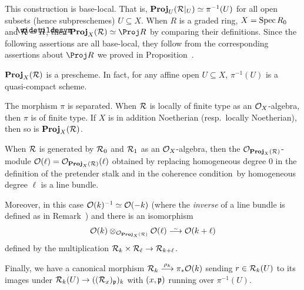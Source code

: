 \documentclass[a4paper,parskip=half,numbers=enddot, DIV=12]{scrreprt}
\begin{document}
This construction is base-local. That is, $\operatorname{\mathbf{Proj}}_U(\mathcal{R}|_U)\simeq \pi^{-1}(U)$ for all open subsets (hence subpreschemes) $U\subseteq X$. When $R$ is a graded ring, $X=\operatorname{Spec} R_0$ and $\Rr=\snake{R}$, then $\PROJ_X(\Rr)\simeq \Proj R$ by comparing their definitions. Since the following assertions are all base-local, they follow from the corresponding assertions about $\Proj R$ we proved in Proposition~.
\begin{fact}
	\begin{alphanumerate}
		\item {}$\operatorname{\mathbf{Proj}}_X(\mathcal{R})$ is a prescheme. In fact, for any affine open $U\subseteq X$, $\pi^{-1}(U)$ is a quasi-compact scheme.
		\item The morphism $\pi$ is separated. When $\mathcal{R}$ is locally of finite type as an $\mathcal{O}_X$-algebra, then $\pi$ is of finite type. If $X$ is in addition Noetherian (resp.\ locally Noetherian), then so is $\operatorname{\mathbf{Proj}}_X(\mathcal{R})$.
		\item When $\mathcal{R}$ is generated by $\mathcal{R}_0$ and $\mathcal{R}_1$ as an $\mathcal{O}_X$-algebra, then the $\mathcal{O}_{\operatorname{\mathbf{Proj}}_X(\mathcal{R})}$-module $\mathcal{O}(\ell)=\mathcal{O}_{\operatorname{\mathbf{Proj}}_X(\mathcal{R})}(\ell)$ obtained by replacing homogeneous degree $0$ in the definition of the pretender stalk and in the coherence condition\texttrademark\ by homogeneous degree $\ell$ is a line bundle. 
		
		Moreover, in this case $\mathcal{O}(k)^{-1}\simeq \mathcal{O}(-k)$ (where the \emph{inverse} of a line bundle is defined as in Remark~) and there is an isomorphism 
		\begin{align*}
			\Oo(k)\otimes_{\Oo_{\PROJ_X(\Rr)}}\Oo(\ell)\isomorphism\Oo(k+\ell)
		\end{align*}
		defined by the multiplication $\Rr_k\times \Rr_\ell\morphism\Rr_{k+\ell}$.
		
		Finally, we have a canonical morphism $\Rr_k\morphism[\rho_k]\pi_*\Oo(k)$ sending $r\in\mathcal{R}_k(U)$ to its images under $\Rr_k(U)\morphism ((\Rr_x)_\pp)_k$ with $(x,\mathfrak{p})$ running over $\pi^{-1}(U)$.
	\end{alphanumerate}
\end{fact}
\end{document}
